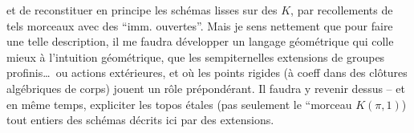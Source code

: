 et de reconstituer en principe les schémas lisses sur des $K$, par recollements de tels morceaux avec des ``imm. ouvertes''. Mais je sens nettement que pour faire une telle description, il me faudra développer un langage géométrique qui colle mieux à l'intuition géométrique, que les sempiternelles extensions de groupes profinis\ldots\ ou actions extérieures, et où les points rigides (à coeff dans des clôtures algébriques de corps) jouent un rôle prépondérant. Il  faudra y revenir dessus -- et en même temps, expliciter les topos étales (pas seulement le ``morceau $K(\pi,1)$) tout entiers des schémas décrits ici par des extensions.
